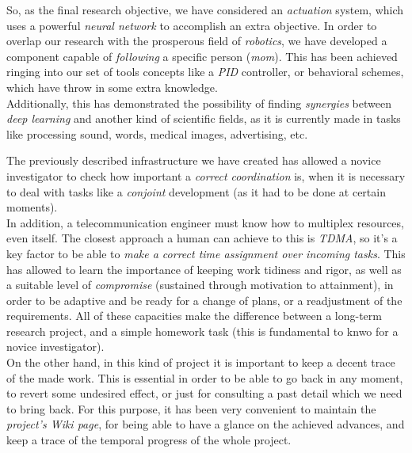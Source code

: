 \begin{description}
			So, as the final research objective, we have considered an \emph{actuation} system, which uses a powerful \emph{neural network} to accomplish an extra objective. In order to overlap our research with the prosperous field of \emph{robotics}, we have developed a component capable of \emph{following} a specific person (\emph{mom}). This has been achieved ringing into our set of tools concepts like a \emph{PID} controller, or behavioral schemes, which have throw in some extra knowledge.\\
			
			Additionally, this has demonstrated the possibility of finding \emph{synergies} between \emph{deep learning} and another kind of scientific fields, as it is currently made in tasks like processing sound, words, medical images, advertising, etc.
		
	\end{description}
	The previously described infrastructure we have created has allowed a novice investigator to check how important a \emph{correct coordination} is, when it is necessary to deal with tasks like a \emph{conjoint} development (as it had to be done at certain moments).\\
	
	
	In addition, a telecommunication engineer must know how to multiplex resources, even itself. The closest approach a human can achieve to this is \emph{TDMA}, so it's a key factor to be able to \emph{make a correct time assignment over incoming tasks}. This has allowed to learn the importance of keeping work tidiness and rigor, as well as a suitable level of \emph{compromise} (sustained through motivation to attainment), in order to be adaptive and be ready for a change of plans, or a readjustment of the requirements. All of these capacities make the difference between a long-term research project, and a simple homework task (this is fundamental to knwo for a novice investigator).\\
	
	
	On the other hand, in this kind of project it is important to keep a decent trace of the made work. This is essential in order to be able to go back in any moment, to revert some undesired effect, or just for consulting a past detail which we need to bring back. For this purpose, it has been very convenient to maintain the \emph{project's Wiki page}, for being able to have a glance on the achieved advances, and keep a trace of the temporal progress of the whole project.\\
	

